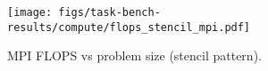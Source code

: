 \begin{figure}[t]
\centering
\texttt{[image: figs/task-bench-results/compute/flops\_stencil\_mpi.pdf]}
\caption{MPI FLOPS vs problem size (stencil pattern).\label{fig:flops-mpi}}
\end{figure}
